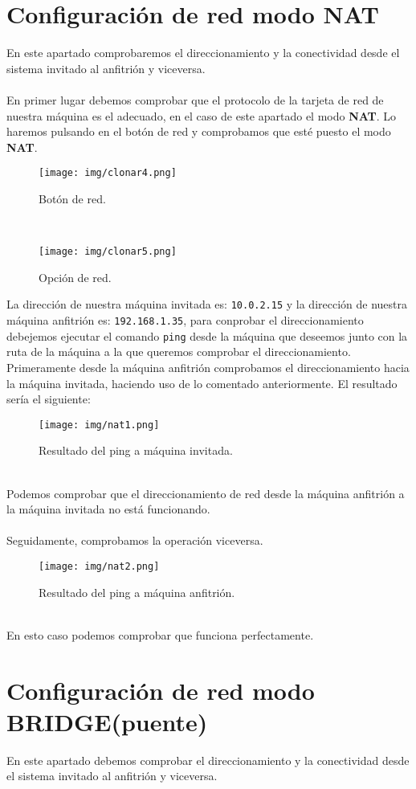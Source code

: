 \documentclass[12pt]{article}
\begin{document}
    \section{Configuración de red modo NAT}
      En este apartado comprobaremos el direccionamiento y la conectividad desde el sistema invitado al anfitrión y viceversa.
      \\\\
      En primer lugar debemos comprobar que el protocolo de la tarjeta de red de nuestra máquina es el adecuado, en el caso de 
      este apartado el modo \textbf{NAT}. Lo haremos pulsando en el botón de red y comprobamos que esté puesto el modo \textbf{NAT}.
      \\
      \begin{figure}[h]
        \centering
        \texttt{[image: img/clonar4.png]}
        \caption{Botón de red.}
        \label{Nat1}
      \end{figure}
      \\
      \begin{figure}[h]
        \centering
        \texttt{[image: img/clonar5.png]}
        \caption{Opción de red.}
        \label{Nat2}
      \end{figure}

      \newpage

      La dirección de nuestra máquina invitada es: \texttt{10.0.2.15} y la dirección de nuestra máquina anfitrión es: \texttt{192.168.1.35}, 
      para conprobar el direccionamiento debejemos ejecutar el comando \texttt{ping} desde la máquina que deseemos junto con la ruta de la 
      máquina a la que queremos comprobar el direccionamiento.
      \\
      Primeramente desde la máquina anfitrión comprobamos el direccionamiento hacia la máquina invitada, haciendo uso de lo comentado anteriormente.
      El resultado sería el siguiente:
      \\
      \begin{figure}[h]
        \centering
        \texttt{[image: img/nat1.png]}
        \caption{Resultado del ping a máquina invitada.}
        \label{Nat3}
      \end{figure}
      \\
      Podemos comprobar que el direccionamiento de red desde la máquina anfitrión a la máquina invitada no está funcionando.
      \\\\
      Seguidamente, comprobamos la operación viceversa.
      \begin{figure}[h]
        \centering
        \texttt{[image: img/nat2.png]}
        \caption{Resultado del ping a máquina anfitrión.}
        \label{Nat4}
      \end{figure}
      \\
      En esto caso podemos comprobar que funciona perfectamente.

      \newpage

    \section{Configuración de red modo BRIDGE(puente)}
      En este apartado debemos comprobar el direccionamiento y la conectividad desde el sistema invitado al anfitrión y viceversa.
\end{document}

